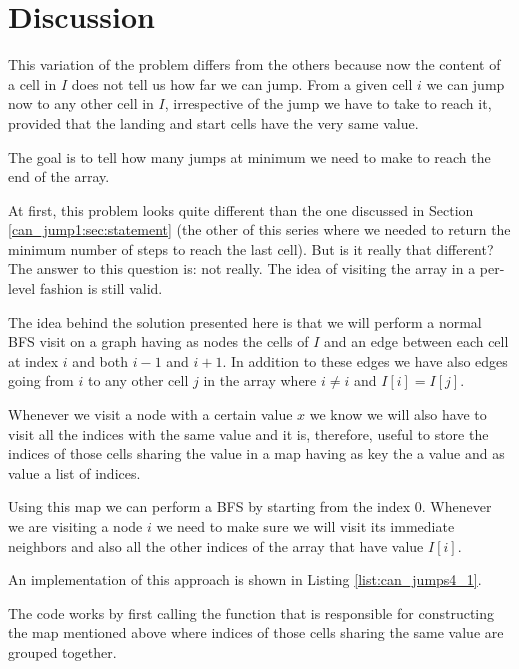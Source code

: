 \section{Discussion}
\label{can_jump4:sec:statement}
This variation of the problem differs from the others because now the content of a cell in $I$ does not tell us how far we can jump. From a given cell $i$ we can jump now to any other cell in $I$, irrespective of the jump we have to take to reach it, provided that the landing and start cells have the very same value.

The goal is to tell how many jumps at minimum we need to make to reach the end of the array.

At first, this problem looks quite different than the one discussed in Section \ref{can_jump1:sec:statement} (the other of this series where we needed to return the minimum number of steps to reach the last cell). But is it really that different? The answer to this question is: not really. The idea of visiting the array in a per-level fashion is still valid.

The idea behind the solution presented here is that we will perform a normal BFS visit on a graph having as nodes the cells of $I$ and an edge between each cell at index $i$ and both $i-1$ and $i+1$. In addition to these edges we have also edges going from $i$ to any other cell $j$ in the array where $i \neq i$ and $I[i] = I[j]$.

Whenever we visit a node with a certain value $x$ we know we will also have to visit all the indices with the same value and it is, therefore, useful to store the indices of those cells sharing the value in a map having as key the a value and as value a list of indices.

Using this map we can perform a BFS by starting from the index $0$. Whenever we are visiting a node $i$ we need to make sure we will visit its immediate neighbors and also all the other indices of the array that have value $I[i]$. 

An implementation of this approach is shown in Listing \ref{list:can_jumps4_1}.




The code works by first calling the function  that is responsible for constructing the map mentioned above where indices of those cells sharing the same value are grouped together.


